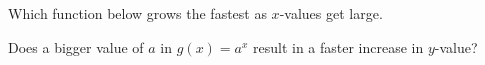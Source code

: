 \documentclass{ximera}
\begin{document}
\begin{question}
Which function below grows the fastest as $x$-values get large.
  \begin{solution}
    \begin{multiple-choice}
    \end{multiple-choice}
    \begin{hint}
      Does a bigger value of $a$ in $g(x)=a^x$ result in a faster increase in $y$-value?
    \end{hint}
  \end{solution}
\end{question}
\end{document}
